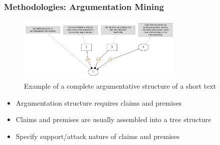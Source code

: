 \documentclass{beamer}
\begin{document}
\subsection{}
\begin{framefont}{\footnotesize}
	\begin{frame}
		\frametitle{Methodologies: Argumentation Mining}
			\vspace{-10pt}
			\begin{figure}				       \captionsetup{justification=centering}
		   	\includegraphics[trim={0cm 0cm 0cm 0cm},clip,width=8cm]{args_structure.png}
		   	\caption{Example of a complete argumentative structure of a short text \citep{peldszus2015annotated}}
			\end{figure}
		\begin{itemize}
			\setlength\itemsep{1.2em}
			\item Argumentation structure requires claims and premises
			\item Claims and premises are usually assembled into a tree structure
			\item Specify support/attack nature of claims and premises
		\end{itemize}
	\end{frame}
\end{framefont}
\end{document}
